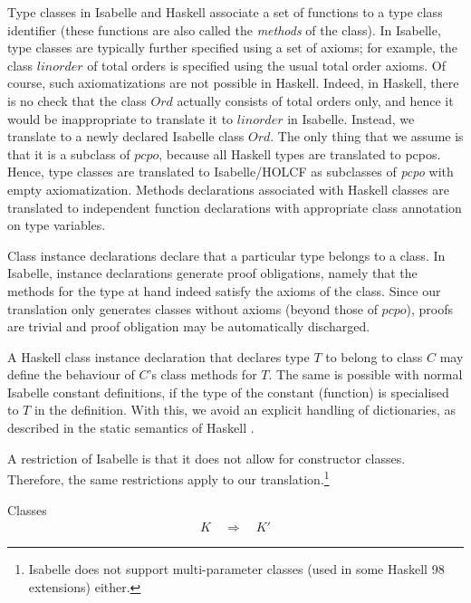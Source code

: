 \documentclass{llncs}
\begin{document}
Type classes in Isabelle and Haskell associate a set of functions to a
type class identifier (these functions are also called the
\emph{methods} of the class). In Isabelle, type classes are typically
further specified using a set of axioms; for example, the class
$\mathit{linorder}$ of total orders is specified using the usual total
order axioms. Of course, such axiomatizations are not possible in
Haskell. Indeed, in Haskell, there is no check that the class $Ord$
actually consists of total orders only, and hence it would be
inappropriate to translate it to $\mathit{linorder}$ in Isabelle.
Instead, we translate to a newly declared Isabelle class $Ord$.  The
only thing that we assume is that it is a subclass of $pcpo$, because
all Haskell types are translated to pcpos.  Hence, type classes are
translated to Isabelle/HOLCF as subclasses of \emph{pcpo} with empty
axiomatization.  Methods declarations associated with Haskell classes
are translated to independent function declarations with appropriate
class annotation on type variables.



Class instance declarations declare that a particular type belongs to
a class. In Isabelle, instance declarations generate proof
obligations, namely that the methods for the type at hand indeed
satisfy the axioms of the class. Since our translation only generates
classes without axioms (beyond those of $pcpo$), proofs are trivial
and proof obligation may be automatically discharged.


A Haskell class instance declaration that declares type $T$
to belong to class $C$ may define the behaviour of $C$'s
class methods for $T$. The same is possible with
normal Isabelle constant definitions, if the type of the
constant (function) is specialised to $T$ in the definition.
With this, we avoid an explicit handling of dictionaries, as
described in the static semantics of Haskell \cite{journals/jfp/Faxen02}.



A restriction of Isabelle is that it does not allow for constructor
classes. Therefore, the same restrictions apply to our
translation.\footnote{Isabelle does not support multi-parameter
  classes (used in some Haskell 98 extensions) either.}  \medskip

\noindent Classes
$$\begin{array}{l}
  K \quad \Longrightarrow \quad K' 
\end{array}$$
\end{document}
